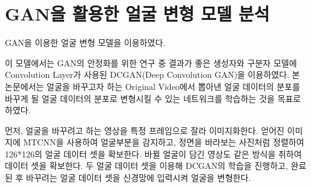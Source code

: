 \documentclass[chapter,oneside]{oblivoir}
\begin{document}
\section{ GAN을 활용한 얼굴 변형 모델 분석}

GAN을 이용한 얼굴 변형 모델\cite{reference11}을 이용하였다.

이 모델에서는 GAN의 안정화를 위한 연구 중 결과가 좋은 생성자와 구분자 모델에 Convolution Layer가 사용된 DCGAN(Deep Convolution GAN)을 이용하였다. 본 논문에서는 얼굴을 바꾸고자 하는 Original Video에서 뽑아낸 얼굴 데이터의 분포를 바꾸게 될 얼굴 데이터의 분포로 변형시킬 수 있는 네트워크를 학습하는 것을 목표로 하였다.

먼저, 얼굴을 바꾸려고 하는 영상을 특정 프레임으로 잘라 이미지화한다. 얻어진 이미지에 MTCNN을 사용하여 얼굴부분을 감지하고,  정면을 바라보는 사진처럼 정렬하여 126*126의 얼굴 데이터 셋을 확보한다. 바뀔 얼굴이 담긴 영상도 같은 방식을 취하여 데이터 셋을 확보한다. 두 얼굴 데이터 셋을 이용해 DCGAN의 학습을 진행하고, 완료된 후 바꾸려는 얼굴 데이터 셋을 신경망에 입력시켜 얼굴을 변형한다.
\end{document}
